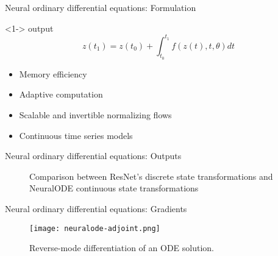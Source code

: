 \begin{frame}{Neural ordinary differential equations: Formulation}

    \begin{block}<1->{ output}
        \begin{equation*}
            z(t_1) = z(t_0) + \int_{t_0}^{t_1}{f(z(t), t, \theta)dt}
        \end{equation*}
    \end{block}

    \begin{itemize}
        \item<2-> Memory efficiency
        \item<3-> Adaptive computation
        \item<4-> Scalable and invertible normalizing flows
        \item<5-> Continuous time series models
    \end{itemize}
\end{frame}

\begin{frame}{Neural ordinary differential equations: Outputs}
    \begin{figure}[h]
        \centering
        \caption{Comparison between ResNet's discrete state transformations and \gls{NeuralODE} continuous state transformations}
        \label{fig:resnet-vs-odenet}
    \end{figure}
\end{frame}

\begin{frame}{Neural ordinary differential equations: Gradients}
    \begin{figure}[h]
        \centering
        \texttt{[image: neuralode-adjoint.png]}
        \caption{Reverse-mode differentiation of an \gls{ODE} solution. \cite{chenNeuralOrdinaryDifferential2019}}
        \label{fig:neuralode-adjoint}
    \end{figure}
\end{frame}
